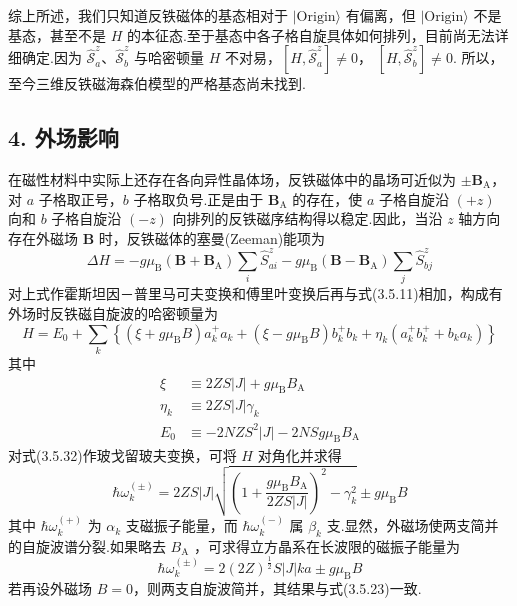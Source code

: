 综上所述，我们只知道反铁磁体的基态相对于 $|\mathrm{Origin}\rangle$
有偏离，但 $|\mathrm{Origin}\rangle$
不是基态，甚至不是 $H$
的本征态.至于基态中各子格自旋具体如何排列，目前尚无法详细确定.因为
$\hat{\mathcal{S}}_a^{z}$、$\hat{\mathcal{S}}_b^{z}$ 与哈密顿量 $H$
不对易，$\left[H,\hat{\mathcal{S}}_a^{z}\right]\neq0$，
$\left[H,\hat{\mathcal{S}}_b^{z}\right]\neq0$.
所以，至今三维反铁磁海森伯模型的严格基态尚未找到.

\subsection*{4. 外场影响}

在磁性材料中实际上还存在各向异性晶体场，反铁磁体中的晶场可近似为
$\pm\boldsymbol{B}_{\mathrm{A}}$，对 $a$ 子格取正号，$b$
子格取负号.正是由于 $\boldsymbol{B}_{\mathrm{A}}$
的存在，使 $a$ 子格自旋沿 $(+z)$ 向和 $b$
子格自旋沿 $(-z)$
向排列的反铁磁序结构得以稳定.因此，当沿 $z$
轴方向存在外磁场 $\boldsymbol{B}$ 时，反铁磁体的塞曼(Zeeman)能项为
\begin{equation}
  \Delta H=-g\mu_{\mathrm{B}}\left(\boldsymbol{B}+\boldsymbol{B}_{\mathrm{A}}\right)\sum_i\hat{S}_{ai}^{z}
  -g\mu_{\mathrm{B}}\left(\boldsymbol{B}-\boldsymbol{B}_{\mathrm{A}}\right)\sum_j\hat{S}_{bj}^{z}
\end{equation}
对上式作霍斯坦因－普里马可夫变换和傅里叶变换后再与式(3.5.11)相加，构成有外场时反铁磁自旋波的哈密顿量为
\begin{equation}
  H=E_0+\sum_k\left\{\left(\xi+g\mu_{\mathrm{B}}B\right)a_k^{+}a_k
  +\left(\xi-g\mu_{\mathrm{B}}B\right)b_k^{+}b_k
  +\eta_k\left(a_k^{+}b_k^{+}+b_ka_k\right)\right\}
\end{equation}
其中
\begin{equation}
\begin{aligned}
  \xi&\equiv2ZS\left|J\right|+g\mu_{\mathrm{B}}B_{\mathrm{A}}\\
  \eta_k&\equiv2ZS\left|J\right|\gamma_k\\
  E_0&\equiv-2NZS^2\left|J\right|-2NSg\mu_{\mathrm{B}}B_{\mathrm{A}}
\end{aligned}
\end{equation}
对式(3.5.32)作玻戈留玻夫变换，可将 $H$ 对角化并求得
\begin{equation}
  \hbar\omega_k^{(\pm)}=2ZS\left|J\right|
  \sqrt{\left(1+\frac{g\mu_{\mathrm{B}}B_{\mathrm{A}}}{2ZS\left|J\right|}\right)^2-\gamma_k^2}
  \pm g\mu_{\mathrm{B}}B
\end{equation}
其中 $\hbar\omega_k^{(+)}$ 为 $\alpha_k$ 支磁振子能量，而
$\hbar\omega_k^{(-)}$ 属 $\beta_k$
支.显然，外磁场使两支简并的自旋波谱分裂.如果略去 $B_{\mathrm{A}}$
，可求得立方晶系在长波限的磁振子能量为
\begin{equation}
  \hbar\omega_k^{(\pm)}=2\left(2Z\right)^{\frac{1}{2}}S\left|J\right|ka\pm g\mu_{\mathrm{B}}B
\end{equation}
若再设外磁场 $B=0$，则两支自旋波简并，其结果与式(3.5.23)一致.


